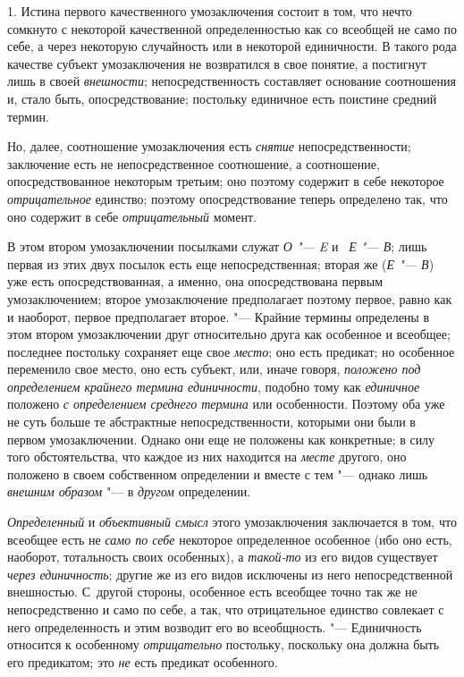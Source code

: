 1. Истина первого качественного умозаключения состоит в том,
что нечто сомкнуто с некоторой качественной определенностью как со всеобщей
не само по себе, а через некоторую случайность или в некоторой единичности.
В такого рода качестве субъект умозаключения не возвратился в свое понятие,
а постигнут лишь в своей {\em внешности};
непосредственность составляет основание соотношения и, стало
быть, опосредствование; постольку единичное есть поистине средний термин.

Но, далее, соотношение умозаключения есть
{\em снятие}
непосредственности; заключение есть не непосредственное
соотношение, а соотношение, опосредствованное некоторым третьим; оно
поэтому содержит в себе некоторое
{\em отрицательное}
единство; поэтому опосредствование теперь определено так, что
оно содержит в себе {\em отрицательный}
момент.

В этом втором умозаключении посылками служат
{\em О "--- E} и
~{\em Е "--- В};
лишь первая из этих двух посылок есть еще непосредственная;
вторая же ({\em Е "--- В})
уже есть опосредствованная, а именно, она опосредствована
первым умозаключением; второе умозаключение предполагает поэтому первое,
равно как и наоборот, первое предполагает второе. "--- Крайние
термины определены в этом втором умозаключении друг относительно друга как
особенное и всеобщее; последнее постольку сохраняет еще свое
{\em место}; оно есть
предикат; но особенное переменило свое место, оно есть субъект, или, иначе
говоря, {\em положено под определением
крайнего термина единичности}, подобно тому как
{\em единичное} положено
{\em с определением среднего термина}
или особенности. Поэтому оба уже не суть больше те
абстрактные непосредственности, которыми они были в первом умозаключении.
Однако они еще не положены как конкретные; в силу того обстоятельства, что
каждое из них находится на {\em месте}
другого, оно положено в своем собственном определении и
вместе с тем "--- однако лишь
{\em внешним образом} "--- в
{\em другом}
определении.

{\em Определенный} и
{\em объективный смысл}
этого умозаключения заключается в том, что всеобщее есть не
{\em само по себе}
некоторое определенное особенное (ибо оно есть, наоборот,
тотальность своих особенных), а
{\em такой-то} из его
видов существует {\em через
единичность}; другие же из его видов исключены из него
непосредственной внешностью. С~другой стороны, особенное есть всеобщее
точно так же не непосредственно и само по себе, а так, что отрицательное
единство совлекает с него определенность и этим возводит его во
всеобщность. "--- Единичность относится к особенному
{\em отрицательно}
постольку, поскольку она должна быть его предикатом; это
{\em не} есть предикат
особенного.


